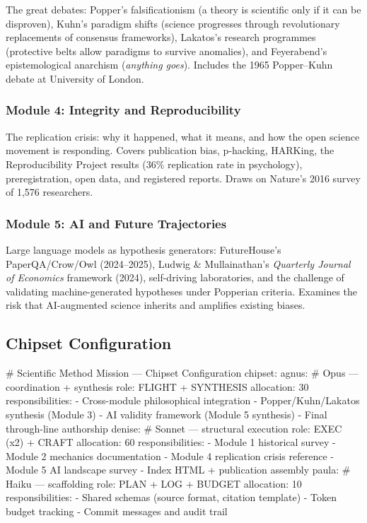\documentclass[11pt,letterpaper]{article}
\begin{document}
The great debates: Popper's falsificationism (a theory is scientific only if it can be disproven), Kuhn's paradigm shifts (science progresses through revolutionary replacements of consensus frameworks), Lakatos's research programmes (protective belts allow paradigms to survive anomalies), and Feyerabend's epistemological anarchism (\emph{anything goes}). Includes the 1965 Popper--Kuhn debate at University of London.

\subsubsection{Module 4: Integrity and Reproducibility}

The replication crisis: why it happened, what it means, and how the open science movement is responding. Covers publication bias, p-hacking, HARKing, the Reproducibility Project results (36\% replication rate in psychology), preregistration, open data, and registered reports. Draws on Nature's 2016 survey of 1,576 researchers.

\subsubsection{Module 5: AI and Future Trajectories}

Large language models as hypothesis generators: FutureHouse's PaperQA/Crow/Owl (2024--2025), Ludwig \& Mullainathan's \emph{Quarterly Journal of Economics} framework (2024), self-driving laboratories, and the challenge of validating machine-generated hypotheses under Popperian criteria. Examines the risk that AI-augmented science inherits and amplifies existing biases.

\subsection{Chipset Configuration}

\begin{asciibox}
  # Scientific Method Mission — Chipset Configuration
  chipset:
    agnus:                    # Opus — coordination + synthesis
      role: FLIGHT + SYNTHESIS
      allocation: 30%
      responsibilities:
        - Cross-module philosophical integration
        - Popper/Kuhn/Lakatos synthesis (Module 3)
        - AI validity framework (Module 5 synthesis)
        - Final through-line authorship
    denise:                   # Sonnet — structural execution
      role: EXEC (x2) + CRAFT
      allocation: 60%
      responsibilities:
        - Module 1 historical survey
        - Module 2 mechanics documentation
        - Module 4 replication crisis reference
        - Module 5 AI landscape survey
        - Index HTML + publication assembly
    paula:                    # Haiku — scaffolding
      role: PLAN + LOG + BUDGET
      allocation: 10%
      responsibilities:
        - Shared schemas (source format, citation template)
        - Token budget tracking
        - Commit messages and audit trail
\end{asciibox}
\end{document}
